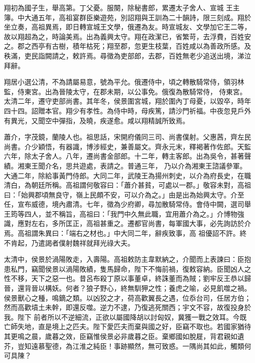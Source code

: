 \begin{pinyinscope}
 翔初為國子生，舉高第。丁父憂。服闋，除秘書郎，累遷太子舍人、宣城
 王主簿。中大通五年，高祖宴群臣樂遊苑，別詔翔與王訓為二十韻詩，限三刻成。翔於坐立奏，高祖異焉，即日轉宣城王文學，俄遷為友。時宣城友、文學加它王二等，故以翔超為之，時論美焉。出為義興太守。翔在政潔已，省繁苛，去浮費，百姓安之。郡之西亭有古樹，積年枯死；翔至郡，忽更生枝葉，百姓咸以為善政所感。及秩滿，吏民詣闕請之，敕許焉。尋徵為吏部郎，去郡，百姓無老少追送出境，涕泣拜辭。



 翔居小選公清，不為請屬易意，號為平允。俄遷侍中，頃之轉散騎常侍，領羽林監，侍東宮。出為晉陵太守，在郡未期，以公事免。俄復為散騎常侍，
 侍東宮。太清二年，遷守吏部尚書。其年冬，侯景圍宮城，翔於圍內丁母憂，以毀卒，時年四十四。詔贈本官。翔少有孝性。為侍中時，母疾篤，請沙門祈福。中夜忽見戶外有異光，又聞空中彈指，及曉，疾遂愈。咸以翔精誠所致焉。



 蕭介，字茂鏡，蘭陵人也。祖思話，宋開府儀同三司、尚書僕射。父惠茜，齊左民尚書。介少穎悟，有器識，博涉經史，兼善屬文。齊永元末，釋褐著作佐郎。天監六年，除太子舍人。八年，遷尚書金部郎。十二年，轉主客郎。出為吳令，甚著聲績。湘東王聞介名，思共遊處，表請之。普通三年，
 乃以介為湘東王諮議參軍。大通二年，除給事黃門侍郎。大同二年，武陵王為揚州刺史，以介為府長史，在職清白，為朝廷所稱。高祖謂何敬容曰：「蕭介甚貧，可處以一郡。」敬容未對，高祖曰：「始興郡頃無良守，嶺上民頗不安，可以介為之。」由是出為始興太守。介至任，宣布威德，境內肅清。七年，徵為少府卿，尋加散騎常侍。會侍中闕，選司舉王筠等四人，並不稱旨，高祖曰：「我門中久無此職，宜用蕭介為之。」介博物強識，應對左右，多所匡正，高祖甚重之。遷都官尚書，每軍國大事，必先詢訪於介焉。高祖謂朱異曰：「端右之材也。」中大同二年，辭疾致事，高
 祖優詔不許。終不肯起，乃遣謁者僕射魏祥就拜光祿大夫。



 太清中，侯景於渦陽敗走，入壽陽。高祖敕防主韋默納之，介聞而上表諫曰：臣抱患私門，竊聞侯景以渦陽敗績，隻馬歸命，陛下不悔前禍，復敕容納。臣聞凶人之性不移，天下之惡一也。昔呂布殺丁原以事董卓，終誅董而為賊；劉牢反王恭以歸晉，還背晉以構妖。何者？狼子野心，終無馴狎之性；養虎之喻，必見飢噬之禍。侯景獸心之種，鳴鏑之類。以凶狡之才，荷高歡翼長之遇，位忝台司，任居方伯；然而高歡墳土未幹，即還反噬。逆力不逮，乃復逃死關西；宇文不容，故復投身於我。陛下
 前者所以不逆細流，正欲以屬國降胡以討匈奴，冀獲一戰之效耳。今既亡師失地，直是境上之匹夫。陛下愛匹夫而棄與國之好，臣竊不取也。若國家猶待其更鳴之晨，歲暮之效，臣竊惟侯景必非歲暮之臣。棄鄉國如脫屣，背君親如遺芥，豈知遠慕聖德，為江淮之純臣！事跡顯然，無可致惑。一隅尚其如此，觸類何可具陳？




\end{pinyinscope}
